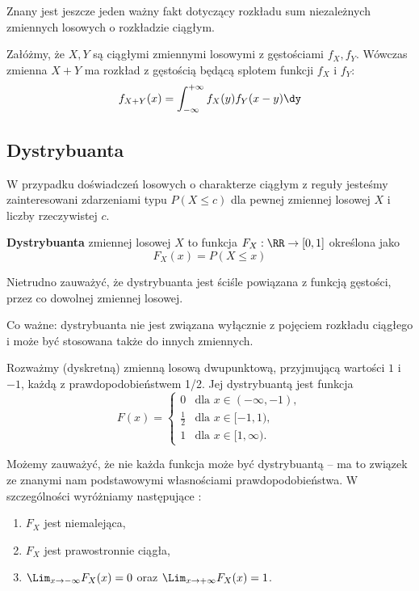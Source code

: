 Znany jest jeszcze jeden ważny fakt dotyczący rozkładu sum niezależnych zmiennych losowych o rozkładzie ciągłym.

Załóżmy, że $X, Y$ są  ciągłymi zmiennymi losowymi z gęstościami $f_X, f_Y$. Wówczas zmienna $X + Y$ ma rozkład z gęstością będącą splotem funkcji $f_X$ i $f_Y$:
$$f_{X + Y}(x) = \int_{-\infty}^{+\infty} f_X(y) f_Y(x - y) \dy$$

\subsection{Dystrybuanta}

W przypadku doświadczeń losowych o charakterze ciągłym z reguły jesteśmy zainteresowani zdarzeniami typu $P(X \leq c)$ dla pewnej zmiennej losowej $X$ i liczby rzeczywistej $c$.

\textbf{Dystrybuanta} zmiennej losowej $X$ to funkcja $F_X : \RR \to [0, 1]$ określona jako $$F_X(x) = P(X \leq x)$$

Nietrudno zauważyć, że dystrybuanta jest ściśle powiązana z funkcją gęstości, przez co  dowolnej zmiennej losowej.

Co ważne: dystrybuanta nie jest związana wyłącznie z pojęciem rozkładu ciągłego i może być stosowana także do innych zmiennych.

\begin{example}
    Rozważmy (dyskretną) zmienną losową dwupunktową, przyjmującą wartości $1$ i $-1$, każdą z prawdopodobieństwem 1/2. Jej dystrybuantą jest funkcja
    $$F(x) = \begin{cases}
        0 & \text{dla } x \in (-\infty, -1), \\
        \frac{1}{2} & \text{dla } x \in [-1, 1), \\
        1 & \text{dla } x \in [1, \infty).
    \end{cases}$$
\end{example}

Możemy zauważyć, że nie każda funkcja może być dystrybuantą -- ma to związek ze znanymi nam podstawowymi własnościami prawdopodobieństwa. W szczególności wyróżniamy następujące :
\begin{enumerate}
    \item $F_X$ jest niemalejąca,
    \item $F_X$ jest prawostronnie ciągła,
    \item $\Lim_{x \to -\infty} F_X(x) = 0$ oraz $\Lim_{x \to +\infty} F_X(x) = 1$.
\end{enumerate}

